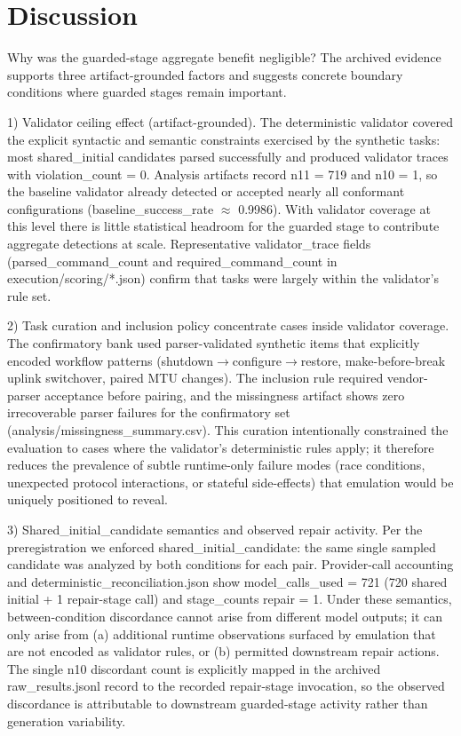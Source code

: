 \documentclass[conference]{IEEEtran}
\begin{document}
\section{Discussion}
Why was the guarded-stage aggregate benefit negligible? The archived evidence supports three artifact-grounded factors and suggests concrete boundary conditions where guarded stages remain important.

1) Validator ceiling effect (artifact-grounded). The deterministic validator covered the explicit syntactic and semantic constraints exercised by the synthetic tasks: most shared\_initial candidates parsed successfully and produced validator traces with violation\_count = 0. Analysis artifacts record n11 = 719 and n10 = 1, so the baseline validator already detected or accepted nearly all conformant configurations (baseline\_success\_rate \ensuremath{\approx} 0.9986). With validator coverage at this level there is little statistical headroom for the guarded stage to contribute aggregate detections at scale. Representative validator\_trace fields (parsed\_command\_count and required\_command\_count in execution/scoring/*.json) confirm that tasks were largely within the validator's rule set.

2) Task curation and inclusion policy concentrate cases inside validator coverage. The confirmatory bank used parser-validated synthetic items that explicitly encoded workflow patterns (shutdown\ensuremath{\rightarrow}configure\ensuremath{\rightarrow}restore, make-before-break uplink switchover, paired MTU changes). The inclusion rule required vendor-parser acceptance before pairing, and the missingness artifact shows zero irrecoverable parser failures for the confirmatory set (analysis/missingness\_summary.csv). This curation intentionally constrained the evaluation to cases where the validator's deterministic rules apply; it therefore reduces the prevalence of subtle runtime-only failure modes (race conditions, unexpected protocol interactions, or stateful side-effects) that emulation would be uniquely positioned to reveal.

3) Shared\_initial\_candidate semantics and observed repair activity. Per the preregistration we enforced shared\_initial\_candidate: the same single sampled candidate was analyzed by both conditions for each pair. Provider-call accounting and deterministic\_reconciliation.json show model\_calls\_used = 721 (720 shared initial + 1 repair-stage call) and stage\_counts repair = 1. Under these semantics, between-condition discordance cannot arise from different model outputs; it can only arise from (a) additional runtime observations surfaced by emulation that are not encoded as validator rules, or (b) permitted downstream repair actions. The single n10 discordant count is explicitly mapped in the archived raw\_results.jsonl record to the recorded repair-stage invocation, so the observed discordance is attributable to downstream guarded-stage activity rather than generation variability.
\end{document}
